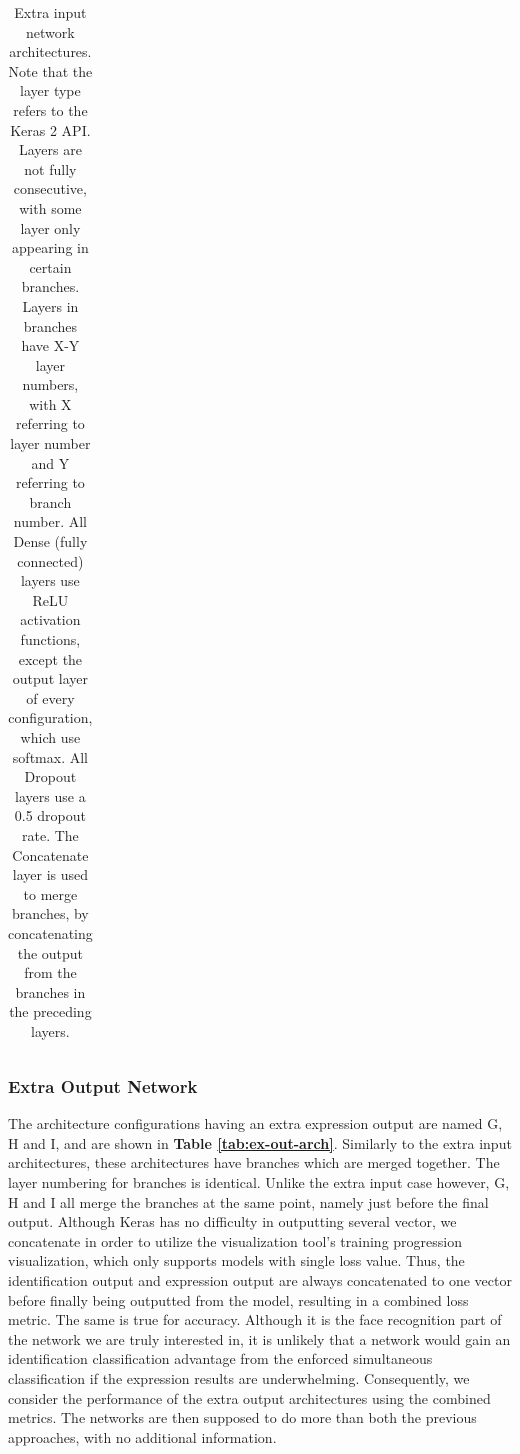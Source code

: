 \begin{table}[h!]
\begin{center}
\begin{tabular}{|c|c|c|c|c|}
\end{tabular}
\end{center}
\caption[Extra input architectures]{Extra input network architectures. Note that the layer type refers to the Keras 2 API. Layers are not fully consecutive, with some layer only appearing in certain branches. Layers in branches have X-Y layer numbers, with X referring to layer number and Y referring to branch number. All Dense (fully connected) layers use ReLU activation functions, except the output layer of every configuration, which use softmax. All Dropout layers use a 0.5 dropout rate. The Concatenate layer is used to merge branches, by concatenating the output from the branches in the preceding layers.}
\label{tab:ex-in-arch}
\end{table}


\subsubsection{Extra Output Network}


The architecture configurations having an extra expression output are named G, H and I, and are shown in \textbf{Table \ref{tab:ex-out-arch}}. Similarly to the extra input architectures, these architectures have branches which are merged together. The layer numbering for branches is identical. Unlike the extra input case however, G, H and I all merge the branches at the same point, namely just before the final output. Although Keras has no difficulty in outputting several vector, we concatenate in order to utilize the visualization tool's training progression visualization, which only supports models with single loss value. Thus, the identification output and expression output are always concatenated to one vector before finally being outputted from the model, resulting in a combined loss metric. The same is true for accuracy. Although it is the face recognition part of the network we are truly interested in, it is unlikely that a network would gain an identification classification advantage from the enforced simultaneous classification if the expression results are underwhelming. Consequently, we consider the performance of the extra output architectures using the combined metrics. The networks are then supposed to do more than both the previous approaches, with no additional information. \\

